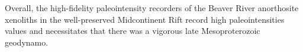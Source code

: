 \documentclass[9pt,twocolumn,twoside,lineno]{pnas-new}
\begin{document}
Overall, the high-fidelity paleointensity recorders of the Beaver River anorthosite xenoliths in the well-preserved Midcontinent Rift record high paleointensities values and necessitates that there was a vigorous late Mesoproterozoic geodynamo. 






\end{document}
